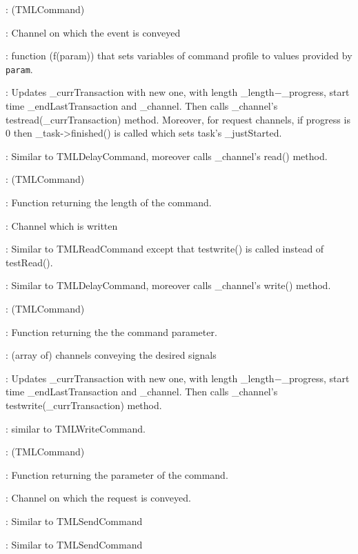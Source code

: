 \documentclass[a4paper,11pt]{article}
\newcommand{\bfont}{\fontseries{b}\selectfont}
\newcommand{\cod}[1]{{\ttfamily #1}}
\newcommand{\class}[2]{\par\vspace{1mm}\hspace{-5mm}\large\colorbox{file}{\textbullet\bfont\cod{#1}:} (\cod{#2})\par}
\newcommand{\method}[1]{\par\vspace{1mm}\hspace{-2mm}\colorbox{method}{\textopenbullet\bfont\cod{#1}:}}
\newcommand{\variable}[1]{\par\vspace{1mm}\hspace{-2mm}\colorbox{variable}{\textopenbullet\bfont\cod{#1}:}}
\begin{document}
\class{TMLWaitCommand}{TMLCommand}
\variable{\_channel} Channel on which the event is conveyed
\variable{\_paramFunc} function (\cod{f(param)}) that sets variables of command profile to values provided by {\tt param}. 
\method{prepareNextTransaction()} Updates \cod{\_currTransaction} with new one, with length \cod{\_length}$-$\cod{\_progress}, start time \cod{\_endLastTransaction} and \cod{\_channel}. Then calls \cod{\_chan\-nel}'s \cod{testread(\_currTransaction)} method. Moreover, for request channels,  if progress is 0 then \cod{\_task->finished()} is called which sets task's \cod{\_justStarted}. 
\method{execute()} Similar to \cod{TMLDelayCommand}, moreover calls \cod{\_channel}'s \cod{read()} method.

\class{TMLWriteCommand}{TMLCommand}
\variable{\_lengthFunc} Function returning the length of the command.
\variable{\_channel} Channel which is written
\method{prepareNextTransaction()} Similar to \cod{TMLReadCommand} except that \cod{testwrite()} is called instead of \cod{testRead()}.
\method{execute()} Similar to \cod{TMLDelayCommand}, moreover calls \cod{\_channel}'s \cod{write()} method.

\class{TMLSendCommand}{TMLCommand}
\variable{\_paramFunc} Function returning the the command parameter.
\variable{\_channel}  (array of) channels conveying the desired signals
\method{prepareNextTransaction()} Updates \cod{\_currTransaction} with new one, with length \cod{\_length}$-$\cod{\_progress}, start time \cod{\_endLastTransaction} and \cod{\_channel}. Then calls \cod{\_chan\-nel}'s \cod{testwrite(\_currTransaction)} method.
\method{execute()} similar to \cod{TMLWriteCommand}.

\class{TMLRequestCommand}{TMLCommand}
\variable{\_paramFunc} Function returning the parameter of the command.
\variable{\_channel} Channel on which the request is conveyed.
\method{prepareNextTransaction()} Similar to \cod{TMLSendCommand}
\method{execute()} Similar to \cod{TMLSendCommand}
\end{document}
